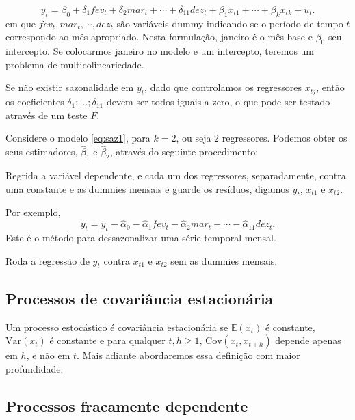 \documentclass[
]{book}
\theoremstyle{definition}
\theoremstyle{definition}
\theoremstyle{definition}
\theoremstyle{remark}
\begin{document}
\begin{equation}
y_t = \beta_0 + \delta_1fev_t + \delta_2mar_t + \cdots + \delta_{11}dez_t + \beta_1x_{t1} +\cdots + \beta_kx_{tk} + u_t.
\label{eq:saz1}
\end{equation}
em que \(fev_t,mar_t,\cdots,dez_t\) são variáveis dummy indicando se o período de tempo \(t\) correspondo ao mês apropriado. Nesta formulação, janeiro é o mês-base e \(\beta_0\) seu intercepto. Se colocarmos janeiro no modelo e um intercepto, teremos um problema de multicolineariedade.

Se não existir sazonalidade em \(y_t\), dado que controlamos os regressores \(x_{tj}\), então
os coeficientes \(\delta_1;\ldots; \delta_{11}\) devem ser todos iguais a zero, o que pode ser testado através de um teste \(F\).

Considere o modelo \eqref{eq:saz1}, para \(k = 2\), ou seja 2 regressores. Podemos obter os seus estimadores, \(\hat{\beta}_1\) e \(\hat{\beta}_2\), através do seguinte procedimento:

Regrida a variável dependente, e cada um dos regressores, separadamente, contra
uma constante e as dummies mensais e guarde os resíduos, digamos \(\ddot{y}_t\), \(\ddot{x}_{t1}\) e \(\ddot{x}_{t2}\).

Por exemplo,
\begin{equation*}
\ddot{y}_t = y_t-\hat{\alpha}_0 - \hat{\alpha}_1fev_t - \hat{\alpha}_2mar_t -\cdots - \hat{\alpha}_{11}dez_t.
\end{equation*}
Este é o método para dessazonalizar uma série temporal mensal.

Roda a regressão de \(\ddot{y}_t\) contra \(\ddot{x}_{t1}\) e \(\ddot{x}_{t2}\) sem as dummies mensais.

\hypertarget{processos-de-covariuxe2ncia-estacionuxe1ria}{%
\subsection{Processos de covariância estacionária}\label{processos-de-covariuxe2ncia-estacionuxe1ria}}

Um processo estocástico é covariância estacionária se \(\mathbb{E} (x_t)\) é constante, \(\mbox{Var}(x_t)\) é constante e para qualquer \(t, h\geq 1\), \(\mbox{Cov}(x_t,x_{t + h})\) depende apenas em \(h\), e não em \(t\). Mais adiante abordaremos essa definição com maior profundidade.

\hypertarget{processos-fracamente-dependente}{%
\subsection{Processos fracamente dependente}\label{processos-fracamente-dependente}}
\end{document}
